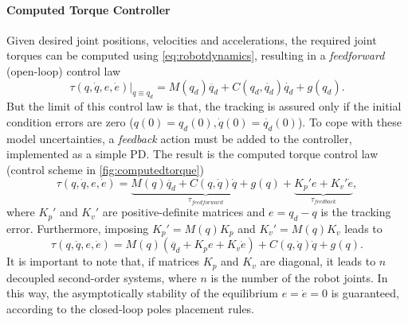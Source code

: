 \paragraph{Computed Torque Controller}
Given desired joint positions, velocities and accelerations, the required joint torques can be computed using \eqref{eq:robotdynamics}, resulting in a \textit{feedforward} (open-loop) control law
\begin{equation*}
\tau(q,\dot{q},e,\dot{e})\vert_{q \equiv q_d} = M(q_d)\ddot{q_d} + C(q_d,\dot{q_d})\dot{q_d} + g(q_d).
\end{equation*}
But the limit of this control law is that, the tracking is assured only if the initial condition errors are zero ($ q(0)=q_d(0),\dot{q}(0)=\dot{q_d}(0) $). To cope with these model uncertainties, a \textit{feedback} action must be added to the controller, implemented as a simple PD. The result is the computed torque control law (control scheme in \autoref{fig:computedtorque})
\begin{equation}
\tau(q,\dot{q},e,\dot{e}) = \underbrace{M(q)\ddot{q_d} + C(q,\dot{q})\dot{q} + g(q)}_{\tau_{feedforward}} +
\underbrace{K_p'e + K_v'\dot{e}}_{\tau_{feedback}},
\end{equation}
where $ K_p' $ and $ K_v' $ are positive-definite matrices and $ e = q_d-q $ is the tracking error.
Furthermore, imposing $ K_p' = M(q)K_p $ and $ K_v' = M(q)K_v $ leads to
\begin{equation}
\tau(q,\dot{q},e,\dot{e}) = M(q)(\ddot{q_d} + K_{p}e + K_{v}\dot{e}) + C(q,\dot{q})\dot{q} + g(q).
\end{equation}
It is important to note that, if matrices $ K_p $ and $ K_v $ are diagonal, it leads to $ n $ decoupled second-order systems, where $ n $ is the number of the robot joints. In this way, the asymptotically stability of the equilibrium $ e = \dot{e} =0 $ is guaranteed, according to the closed-loop poles placement rules.

